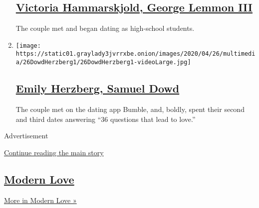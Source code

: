 \begin{enumerate}
  \hypertarget{victoria-hammarskjold-george-lemmon-iii}{%
  \subsection{\texorpdfstring{\href{/2020/05/10/fashion/weddings/victoria-hammarskjold-george-lemmon-iii.html}{Victoria
  Hammarskjold, George Lemmon
  III}}{Victoria Hammarskjold, George Lemmon III}}\label{victoria-hammarskjold-george-lemmon-iii}}

  The couple met and began dating as high-school students.
\item
  \texttt{[image: https://static01.graylady3jvrrxbe.onion/images/2020/04/26/multimedia/26DowdHerzberg1/26DowdHerzberg1-videoLarge.jpg]}

  \hypertarget{emily-herzberg-samuel-dowd}{%
  \subsection{\texorpdfstring{\href{/2020/04/26/fashion/weddings/emily-herzberg-samuel-dowd.html}{Emily
  Herzberg, Samuel
  Dowd}}{Emily Herzberg, Samuel Dowd}}\label{emily-herzberg-samuel-dowd}}

  The couple met on the dating app Bumble, and, boldly, spent their
  second and third dates answering ``36 questions that lead to love.''
\end{enumerate}

Advertisement

\protect\hyperlink{after-mid4}{Continue reading the main story}

\hypertarget{modern-love-1}{%
\subsection{\texorpdfstring{\href{/column/modern-love}{Modern
Love}}{Modern Love}}\label{modern-love-1}}

\href{/column/modern-love}{More in Modern Love »}

